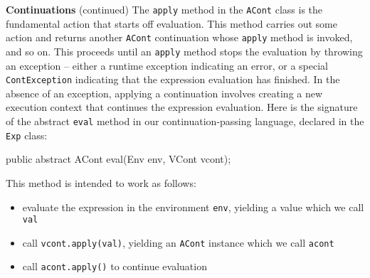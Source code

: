 \begin{minipage}[t]{\sw}
\slidenumber
\LARGE
{\bf Continuations} (continued)\exx
The \verb'apply' method in the \verb'ACont' class
is the fundamental action that starts off evaluation.
This method carries out some action
and returns another \verb'ACont' continuation
whose \verb'apply' method is invoked, and so on.
This proceeds until an \verb'apply' method stops the evaluation
by throwing an exception --
either a runtime exception indicating an error,
or a special \verb'ContException' indicating
that the expression evaluation has finished.\exx
In the absence of an exception,
applying a continuation involves creating a new execution context
that continues the expression evaluation.\exx
Here is the signature of the abstract \verb'eval' method
in our continuation-passing language,
declared in the \verb'Exp' class:
\begin{qv}
public abstract ACont eval(Env env, VCont vcont);
\end{qv}
This method is intended to work as follows:

\begin{itemize}
\setlength{\parskip}{0ex}
\item evaluate the expression in the environment \verb'env',
      yielding a value which we call \verb'val'
\item call \verb'vcont.apply(val)', yielding an \verb'ACont' instance
      which we call \verb'acont'
\item call \verb'acont.apply()' to continue evaluation
\end{itemize}
\end{minipage}
